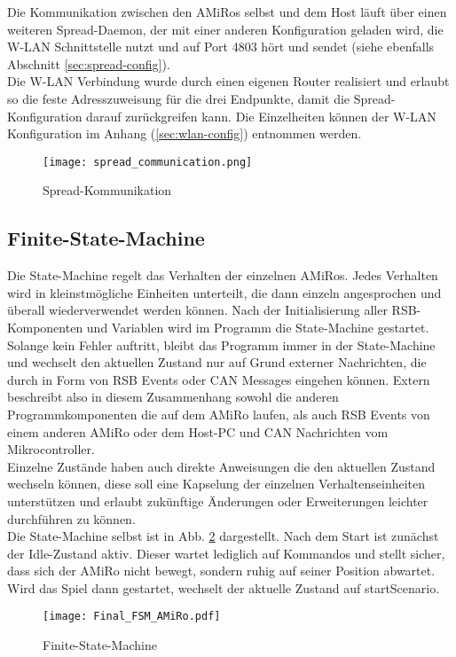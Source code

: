Die Kommunikation zwischen den AMiRos selbst und dem Host läuft über einen weiteren Spread-Daemon, der mit einer anderen Konfiguration geladen wird, die W-LAN Schnittstelle nutzt und auf Port  4803 hört und sendet (siehe ebenfalls Abschnitt \ref{sec:spread-config}).\\
Die W-LAN Verbindung wurde durch einen eigenen Router realisiert und erlaubt so die feste Adresszuweisung für die drei Endpunkte, damit die Spread-Konfiguration darauf zurückgreifen kann. Die Einzelheiten können der W-LAN Konfiguration im Anhang (\ref{sec:wlan-config}) entnommen werden.
\begin{figure}[H]
	\begin{center}
		\texttt{[image: spread\_communication.png]} 	
		\caption{Spread-Kommunikation}
		\label{fig:spread}
	\end{center}
\end{figure}

\subsection{Finite-State-Machine} %
Die State-Machine regelt das Verhalten der einzelnen AMiRos. Jedes Verhalten wird in kleinstmögliche Einheiten unterteilt, die dann einzeln angesprochen und überall wiederverwendet werden können. Nach der Initialisierung aller RSB-Komponenten und Variablen wird im Programm die State-Machine gestartet.\\ 
Solange kein Fehler auftritt, bleibt das Programm immer in der State-Machine und wechselt den aktuellen Zustand nur auf Grund externer Nachrichten, die durch in Form von RSB Events oder CAN Messages eingehen können. Extern beschreibt also in diesem Zusammenhang sowohl die anderen Programmkomponenten die auf dem AMiRo laufen, als auch RSB Events von einem anderen AMiRo oder dem Host-PC und CAN Nachrichten vom Mikrocontroller.\\
Einzelne Zustände haben auch direkte Anweisungen die den aktuellen Zustand wechseln können, diese soll eine Kapselung der einzelnen Verhaltenseinheiten unterstützen und erlaubt zukünftige Änderungen oder Erweiterungen leichter durchführen zu können.\\
Die State-Machine selbst ist in Abb. \ref{fig:fsm-amiro} dargestellt. Nach dem Start ist zunächst der Idle-Zustand aktiv. Dieser wartet lediglich auf Kommandos und stellt sicher, dass sich der AMiRo nicht bewegt, sondern ruhig auf seiner Position abwartet.\\
Wird das Spiel dann gestartet, wechselt der aktuelle Zustand auf startScenario.
\begin{figure}[H]
	\begin{center}
		\texttt{[image: Final\_FSM\_AMiRo.pdf]} 	
		\caption{Finite-State-Machine}
		\label{fig:fsm-amiro}
	\end{center}
\end{figure}

